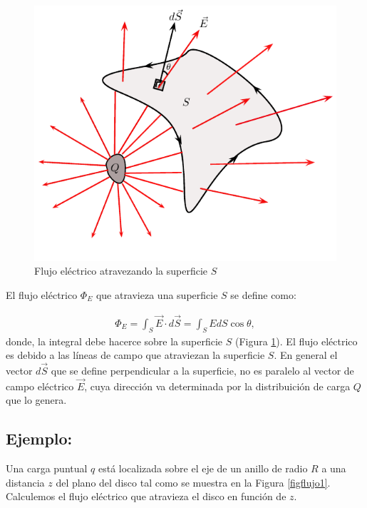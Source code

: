 \begin{figure}[h]
\begin{center}
\includegraphics[scale=0.7]{electrostatica/gauss1}
\end{center}
\caption{Flujo eléctrico atravezando la superficie $S$}
\label{figgauss1}
\end{figure}

El flujo eléctrico $\Phi_E$ que atravieza una superficie $S$ se define como:

\begin{eqnarray}
\boxed{\Phi_E=\int_S \vec{E} \cdot d\vec{S} = \int_S E dS \cos \theta } ,
\end{eqnarray}
donde, la integral debe hacerce sobre la superficie $S$ (Figura \ref{figgauss1}). El flujo eléctrico es debido a las líneas de campo que atraviezan la superficie $S$. 
En general el vector $d\vec{S}$ que se define perpendicular a la superficie, no es paralelo al vector de campo eléctrico $\vec{E}$, cuya dirección va determinada por la distribuición de carga $Q$ que lo genera. 

\subsection*{Ejemplo:}

Una carga puntual $q$ está localizada sobre el eje de un anillo de radio $R$ a una distancia $z$ del plano del disco tal como se muestra en la Figura \ref{figflujo1}. Calculemos el flujo eléctrico que atravieza el disco en función de $z$.%

